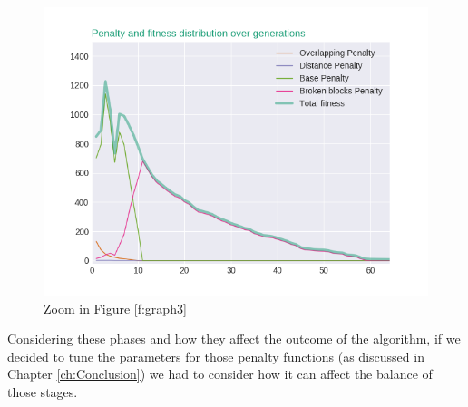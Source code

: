 \begin{figure}[H]
	\centering
	\includegraphics[scale=0.6]{gfx/penalty_evolution_lines_zoom.png}
	\caption{Zoom in Figure \ref{f:graph3}}\label{f:graph4}
\end{figure}

Considering these phases and how they affect the outcome of the algorithm, if we decided to tune the parameters for those penalty functions (as discussed in Chapter \ref{ch:Conclusion}) we had to consider how it can affect the balance of those stages. 

